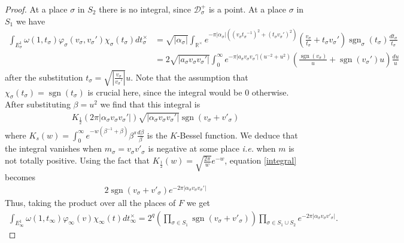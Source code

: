 \documentclass[11pt]{article} %
\newcommand{\8}{\infty}
\newcommand{\D}{\mathcal{D}}
\newcommand{\R}{\mathbb{R}}
\newcommand{\sgn}{\operatorname{sgn}}
\theoremstyle{mytheoremstyle}
\theoremstyle{remark}
\numberwithin{equation}{section}
\begin{document}
\begin{proof}
    At a place $\sigma$ in $S_2$ there is no integral, since $\D_\sigma^+$ is a point. At a place $\sigma$ in $S_1$ we have
    \begin{align}
   \int_{E_\sigma^{1}} \omega(1,{t_\sigma})\varphi_\sigma(v_\sigma,v_\sigma')\chi_\sigma(t_\sigma)dt_\sigma^\times & =  \sqrt{\vert \alpha_\sigma \vert} \int_{\R^\times} e^{- \pi \vert \alpha_\sigma \vert \left ( (v_\sigma {t_\sigma}^{-1})^2+({t_\sigma}v_\sigma')^2\right )} \left ( \frac{v_\sigma}{{t_\sigma}}+{t_\sigma}v_\sigma' \right ) \sgn_\sigma(t_\sigma) \frac{d{t_\sigma}}{{t_\sigma}}  \nonumber \\
        & =  2\sqrt{\vert a_\sigma v_\sigma v_\sigma'\vert} \int_0^\8 e^{- \pi \vert a_\sigma v_\sigma v_\sigma' \vert \left ( u^{-2}+u^2\right )} \left ( \frac{\sgn(v_\sigma)}{u}+\sgn(v_\sigma')u \right ) \frac{du}{u} \nonumber 
    \end{align}
    after the substitution $t_\sigma=\sqrt{\left \vert \frac{v_\sigma}{v_\sigma'}\right \vert} u$. Note that the assumption that $\chi_\sigma(t_\sigma)=\sgn(t_\sigma)$ is crucial here, since the integral would be $0$ otherwise. After substituting $\beta=u^2$ we find that this integral is
    \begin{align} \label{integral}
      K_{\frac{1}{2}}(2 \pi \vert \alpha_\sigma v_\sigma v_\sigma'\vert) \sqrt{\vert \alpha_\sigma v_\sigma v_\sigma'\vert} \sgn(v_\sigma+v'_\sigma)
    \end{align}
    where $K_s(w)=\int_0^\8e^{-w(\beta^{-1}+\beta)}\beta^s\frac{d\beta}{\beta}$ is the $K$-Bessel function. We deduce that the integral vanishes when $m_\sigma=v_\sigma v'_\sigma $ is negative at some place {\em i.e.} when $m$ is not totally positive. Using the fact that $K_{\frac{1}{2}}(w)=\sqrt{\frac{2 \pi}{w}}e^{-w}$, equation \eqref{integral} becomes
    \begin{align}
        2\sgn(v_\sigma+v'_\sigma)e^{-2 \pi \vert \alpha_\sigma v_\sigma v_\sigma'\vert}
    \end{align} Thus, taking the product over all the places of $F$ we get
    \begin{align}\label{integral1}
        \int_{E_\8^{1}} \omega(1,t_\8)\varphi_\8(v) \chi_\8(t)dt_\8^\times = 2^q \left (\prod_{\sigma \in S_1} \sgn(v_\sigma+v'_\sigma) \right ) \prod_{\sigma \in S_1 \cup S_2} e^{-2\pi \vert \alpha_\sigma v_\sigma v'_\sigma \vert}.
    \end{align}
\end{proof}
\end{document}
